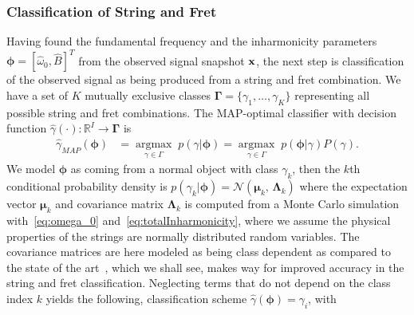 \documentclass{article}
\begin{document}
\begin{sloppy}
\subsubsection{Classification of String and Fret}\label{sec:classifier}
Having found the fundamental frequency and the inharmonicity parameters $\boldsymbol{\phi} = [\widehat{\omega}_0, \widehat{B} ]^T$ from the observed signal snapshot $\mathbf x$, the next step is classification of the observed signal as being produced from a string and fret combination. 
We have a set of $K$ mutually exclusive classes $\boldsymbol{\Gamma}=\{\gamma_1,\dots,\gamma_K\}$ representing all possible string and fret combinations. The MAP-optimal classifier with decision function $\hat{\gamma}(\cdot): \mathbb{R}^I \rightarrow \boldsymbol{\Gamma}  $ is 
\begin{align}
    \hat\gamma_{{MAP}}(\boldsymbol{\phi}) &= \underset{\gamma\in\Gamma}{\operatorname{argmax}}\;{p(\gamma|\boldsymbol{\phi})} = \underset{\gamma\in\Gamma}{\operatorname{argmax}}\;{p(\boldsymbol{\phi}|\gamma)P(\gamma)}.
\end{align}
We model $\boldsymbol{\phi}$ as coming from a normal object with class $\gamma_k$, then the $k$th conditional probability density is   
    $p(\gamma_k\lvert\boldsymbol{\phi}) =
    \mathcal{N}(\boldsymbol{\mu}_k,\,\boldsymbol{\Lambda}_k)$ %
where the expectation vector $\boldsymbol{\mu}_k$ and covariance matrix $\boldsymbol{ \Lambda }_k$ is computed from a Monte Carlo simulation with~\eqref{eq:omega_0} and~\eqref{eq:totalInharmonicity}, where we assume the physical properties of the strings are normally distributed random variables. The covariance matrices are here modeled as being class dependent as compared to the state of the art~\cite{hjerrild::icassp19}, which we shall see, makes way for improved accuracy in the string and fret classification. %
%
Neglecting terms that do not depend on the class index $k$ yields the following, classification scheme $\hat{\gamma}(\boldsymbol{\phi})={\gamma}_i$, with
%
\begin{equation}\label{eq:classifier}

\end{equation}
\end{sloppy}
\end{document}
